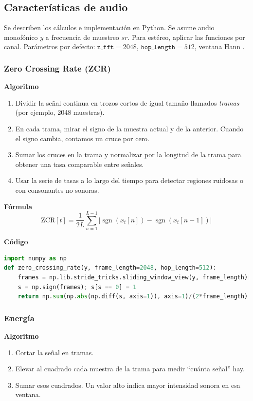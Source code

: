 

\subsection{Características de audio}
Se describen los cálculos e implementación en Python. Se asume audio monofónico \(y\) a frecuencia de muestreo \(sr\). Para estéreo, aplicar las funciones por canal. Parámetros por defecto: \(\texttt{n\_fft}=2048\), \(\texttt{hop\_length}=512\), ventana Hann \parencite{mcfee2015librosa}.

\subsubsection{Zero Crossing Rate (ZCR)}
\textbf{Algoritmo} \parencite{rabiner2011tasdp, tzanetakis2002musical}
\begin{enumerate}
    \item Dividir la señal continua en trozos cortos de igual tamaño llamados \emph{tramas} (por ejemplo, 2048 muestras).
    \item En cada trama, mirar el signo de la muestra actual y de la anterior. Cuando el signo cambia, contamos un cruce por cero.
    \item Sumar los cruces en la trama y normalizar por la longitud de la trama para obtener una tasa comparable entre señales.
    \item Usar la serie de tasas a lo largo del tiempo para detectar regiones ruidosas o con consonantes no sonoras.
\end{enumerate}

\textbf{Fórmula}
\[
\text{ZCR}[t]=\frac{1}{2L}\sum_{n=1}^{L-1}\big|\operatorname{sgn}(x_t[n])-\operatorname{sgn}(x_t[n-1])\big|
\]

\textbf{Código}
\begin{lstlisting}[language=Python, label={lst:zcr_code}, caption={ZCR por tramas}]
import numpy as np
def zero_crossing_rate(y, frame_length=2048, hop_length=512):
    frames = np.lib.stride_tricks.sliding_window_view(y, frame_length)[::hop_length]
    s = np.sign(frames); s[s == 0] = 1
    return np.sum(np.abs(np.diff(s, axis=1)), axis=1)/(2*frame_length)
\end{lstlisting}

\subsubsection{Energía}
\textbf{Algoritmo} \parencite{giannakopoulos2014intro, muller2015fmp}
\begin{enumerate}
    \item Cortar la señal en tramas.
    \item Elevar al cuadrado cada muestra de la trama para medir “cuánta señal” hay.
    \item Sumar esos cuadrados. Un valor alto indica mayor intensidad sonora en esa ventana.
\end{enumerate}

